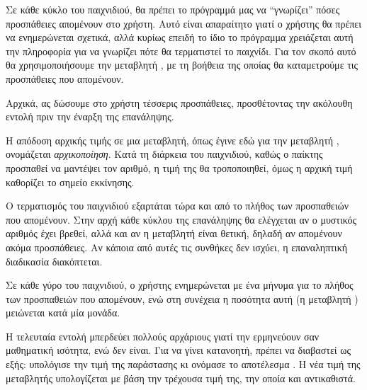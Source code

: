 \documentclass[a4paper,11pt,oneside]{book}
\begin{document}
Σε κάθε κύκλο του παιχνιδιού, θα πρέπει το πρόγραμμά μας να ``γνωρίζει'' πόσες προσπάθειες απομένουν στο χρήστη. Αυτό είναι απαραίτητο γιατί ο χρήστης θα πρέπει να ενημερώνεται σχετικά, αλλά κυρίως επειδή το ίδιο το πρόγραμμα χρειάζεται αυτή την πληροφορία για να γνωρίζει πότε θα τερματιστεί το παιχνίδι. Για τον σκοπό αυτό θα χρησιμοποιήσουμε την μεταβλητή , με τη βοήθεια της οποίας θα καταμετρούμε τις προσπάθειες που απομένουν.

Αρχικά, ας δώσουμε στο χρήστη τέσσερις προσπάθειες, προσθέτοντας την ακόλουθη εντολή πριν την έναρξη της επανάληψης.


Η απόδοση αρχικής τιμής σε μια μεταβλητή, όπως έγινε εδώ για την μεταβλητή , ονομάζεται \emph{αρχικοποίηση}. Κατά τη διάρκεια του παιχνιδιού, καθώς ο παίκτης προσπαθεί να μαντέψει τον αριθμό, η τιμή της  θα τροποποιηθεί, όμως η αρχική τιμή καθορίζει το σημείο εκκίνησης.


Ο τερματισμός του παιχνιδιού εξαρτάται τώρα και από το πλήθος των προσπαθειών που απομένουν. Στην αρχή κάθε κύκλου της επανάληψης θα ελέγχεται αν ο μυστικός αριθμός έχει βρεθεί, αλλά και αν η μεταβλητή  είναι θετική, δηλαδή αν απομένουν ακόμα προσπάθειες. Αν κάποια από αυτές τις συνθήκες δεν ισχύει, η επαναληπτική διαδικασία διακόπτεται. 


Σε κάθε γύρο του παιχνιδιού, ο χρήστης ενημερώνεται με ένα μήνυμα για το πλήθος των προσπαθειών που απομένουν, ενώ στη συνέχεια η ποσότητα αυτή (η μεταβλητή ) μειώνεται κατά μία μονάδα.


\clearpage
H τελευταία εντολή μπερδεύει πολλούς αρχάριους γιατί την ερμηνεύουν σαν μαθηματική ισότητα, ενώ δεν είναι. Για να γίνει κατανοητή, πρέπει να διαβαστεί ως εξής: υπολόγισε την τιμή της παράστασης  κι ονόμασε το αποτέλεσμα . Η νέα τιμή της μεταβλητής  υπολογίζεται με βάση την τρέχουσα τιμή της, την οποία και αντικαθιστά. 
\end{document}
